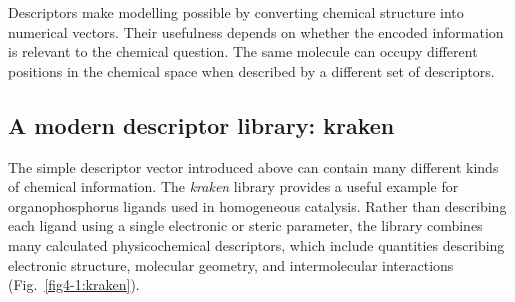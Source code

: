 
\begin{conceptbox}
  Descriptors make modelling possible by converting chemical structure into numerical vectors.
  Their usefulness depends on whether the encoded information is relevant to the chemical question.
  The same molecule can occupy different positions in the chemical space when described by a different set of descriptors.
\end{conceptbox}

\subsection{A modern descriptor library: kraken}

The simple descriptor vector introduced above can contain many different kinds of chemical information.
The \textit{kraken} library provides a useful example for organophosphorus ligands used in homogeneous catalysis.
Rather than describing each ligand using a single electronic or steric parameter, the library combines many calculated physicochemical descriptors, which include quantities describing electronic structure, molecular geometry, and intermolecular interactions (Fig.~\ref{fig4-1:kraken}).

